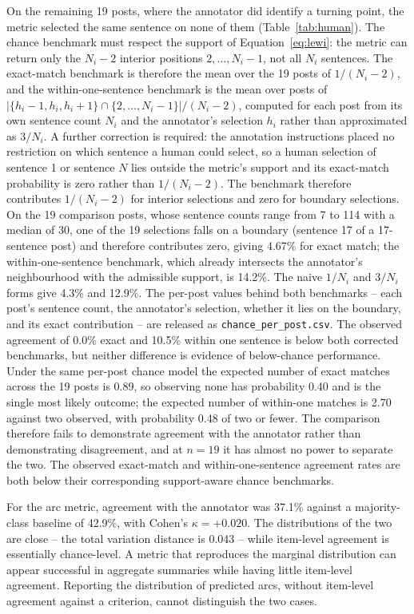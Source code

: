 \documentclass[fleqn,10pt]{wlscirep}
\begin{document}
On the remaining 19 posts, where the annotator did identify a turning point, the metric selected the same sentence on none of them (Table~\ref{tab:human}). The chance benchmark must respect the support of Equation~\eqref{eq:lewi}: the metric can return only the $N_i-2$ interior positions $2,\dots,N_i-1$, not all $N_i$ sentences. The exact-match benchmark is therefore the mean over the 19 posts of $1/(N_i-2)$, and the within-one-sentence benchmark is the mean over posts of $|\{h_i-1, h_i, h_i+1\} \cap \{2,\dots,N_i-1\}| / (N_i-2)$, computed for each post from its own sentence count $N_i$ and the annotator's selection $h_i$ rather than approximated as $3/N_i$. A further correction is required: the annotation instructions placed no restriction on which sentence a human could select, so a human selection of sentence 1 or sentence $N$ lies outside the metric's support and its exact-match probability is zero rather than $1/(N_i-2)$. The benchmark therefore contributes $1/(N_i-2)$ for interior selections and zero for boundary selections. On the 19 comparison posts, whose sentence counts range from 7 to 114 with a median of 30, one of the 19 selections falls on a boundary (sentence 17 of a 17-sentence post) and therefore contributes zero, giving 4.67\% for exact match; the within-one-sentence benchmark, which already intersects the annotator's neighbourhood with the admissible support, is 14.2\%. The naive $1/N_i$ and $3/N_i$ forms give 4.3\% and 12.9\%. The per-post values behind both benchmarks -- each post's sentence count, the annotator's selection, whether it lies on the boundary, and its exact contribution -- are released as \texttt{chance\_per\_post.csv}. The observed agreement of 0.0\% exact and 10.5\% within one sentence is below both corrected benchmarks, but neither difference is evidence of below-chance performance. Under the same per-post chance model the expected number of exact matches across the 19 posts is 0.89, so observing none has probability 0.40 and is the single most likely outcome; the expected number of within-one matches is 2.70 against two observed, with probability 0.48 of two or fewer. The comparison therefore fails to demonstrate agreement with the annotator rather than demonstrating disagreement, and at $n=19$ it has almost no power to separate the two. The observed exact-match and within-one-sentence agreement rates are both below their corresponding support-aware chance benchmarks.

For the arc metric, agreement with the annotator was 37.1\% against a majority-class baseline of 42.9\%, with Cohen's $\kappa = +0.020$. The distributions of the two are close -- the total variation distance is 0.043 -- while item-level agreement is essentially chance-level. A metric that reproduces the marginal distribution can appear successful in aggregate summaries while having little item-level agreement. Reporting the distribution of predicted arcs, without item-level agreement against a criterion, cannot distinguish the two cases.
\end{document}
